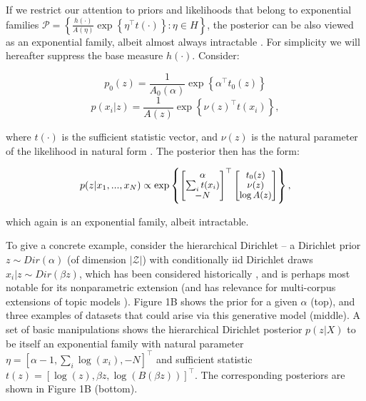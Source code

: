 \documentclass[twoside]{article}
\begin{document}
If we restrict our attention to priors and likelihoods that belong to exponential families $\mathcal{P} = \left\{ \frac{h(\cdot)}{A(\eta)} \exp\left\{ \eta^\top t(\cdot) \right \} : \eta \in H \right\}$, the posterior can be also viewed as an exponential family, albeit almost always intractable \cite{wainwright2008graphical}.  For simplicity we will hereafter suppress the base measure $h(\cdot)$.  Consider:

{\small $$ p_0(z) = \frac{1}{A_0(\alpha)} \exp\left\{ \alpha^\top t_0(z) \right\} $$} 
{\small $$p(x_i|z) = \frac{1}{A(z)} \exp\left\{ \nu(z)^\top t(x_i) \right \},$$}

where $t(\cdot)$ is the sufficient statistic vector, and $\nu(z)$ is the natural parameter of the likelihood in natural form \cite{robert2007bayesian}.   The posterior then has the form:

\begin{equation}
{\small
  p(z | x_1,...,x_N)  \propto  \exp\left\{ \begin{bmatrix} \alpha \\ \sum_i t(x_i) \\ -N \end{bmatrix}^\top\begin{bmatrix} t_0(z) \\ \nu(z) \\ \log A(z) \end{bmatrix} \right\},
  }
\label{eq:1}
\end{equation}

which again is an exponential family, albeit intractable.

To give a concrete example, consider the hierarchical Dirichlet -- a Dirichlet prior $z\sim Dir(\alpha)$ (of dimension $|\mathcal{Z}|$) with conditionally iid Dirichlet draws $x_i | z \sim Dir(\beta z)$, which has been considered historically \cite{mackay1995hierarchical}, and is perhaps most notable for its nonparametric extension \cite{teh2006hdp} (and has relevance for multi-corpus extensions of topic models \cite{blei2003latent, pritchard2000inference}).  
Figure 1B shows the prior for a given $\alpha$ (top), and three examples of datasets that could arise via this generative model (middle).  
A set of basic manipulations shows the hierarchical Dirichlet posterior $p(z|X)$ to be itself an exponential family with natural parameter $\eta = \left[ \alpha -1 , \sum_i \log(x_i) , -N \right]^\top$ and sufficient statistic $t(z) = \left[ \log(z), \beta z , \log(B(\beta z)) \right]^\top$.%
The corresponding posteriors are shown in Figure 1B (bottom).  
\end{document}
